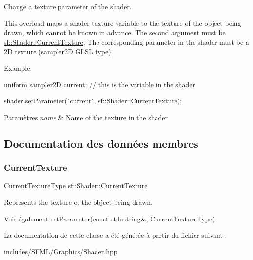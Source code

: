 Change a texture parameter of the shader. 

This overload maps a shader texture variable to the texture of the object being drawn, which cannot be known in advance. The second argument must be \hyperlink{classsf_1_1Shader_ac84c7953eec2e19358ea6e2cc5385b8d}{sf\+::\+Shader\+::\+Current\+Texture}. The corresponding parameter in the shader must be a 2D texture (sampler2D G\+L\+SL type).

Example\+: 
\begin{DoxyCode}
uniform sampler2D current; \textcolor{comment}{// this is the variable in the shader}
\end{DoxyCode}
 
\begin{DoxyCode}
shader.setParameter(\textcolor{stringliteral}{"current"}, \hyperlink{classsf_1_1Shader_ac84c7953eec2e19358ea6e2cc5385b8d}{sf::Shader::CurrentTexture});
\end{DoxyCode}



\begin{DoxyParams}{Paramètres}
{\em name} & Name of the texture in the shader \\
\hline
\end{DoxyParams}


\subsection{Documentation des données membres}
\mbox{\label{classsf_1_1Shader_ac84c7953eec2e19358ea6e2cc5385b8d}} 
\subsubsection{\texorpdfstring{Current\+Texture}{CurrentTexture}}
{\footnotesize\ttfamily \hyperlink{structsf_1_1Shader_1_1CurrentTextureType}{Current\+Texture\+Type} sf\+::\+Shader\+::\+Current\+Texture\hspace{0.3cm}{\ttfamily [static]}}



Represents the texture of the object being drawn. 

\begin{DoxySeeAlso}{Voir également}
\hyperlink{classsf_1_1Shader_af06b4cba0bab915fa01032b063909044}{set\+Parameter(const std\+::string\&, Current\+Texture\+Type)} 
\end{DoxySeeAlso}


La documentation de cette classe a été générée à partir du fichier suivant \+:\begin{DoxyCompactItemize}
\item 
includes/\+S\+F\+M\+L/\+Graphics/Shader.\+hpp\end{DoxyCompactItemize}
